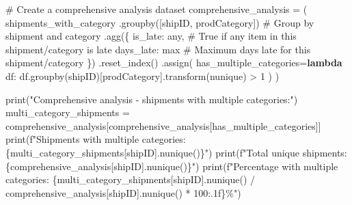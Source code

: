 \documentclass[
]{article}
\newenvironment{Shaded}{\begin{snugshade}}{\end{snugshade}}
\newcommand{\BuiltInTok}[1]{\textcolor[rgb]{0.00,0.23,0.31}{#1}}
\newcommand{\CommentTok}[1]{\textcolor[rgb]{0.37,0.37,0.37}{#1}}
\newcommand{\DecValTok}[1]{\textcolor[rgb]{0.68,0.00,0.00}{#1}}
\newcommand{\KeywordTok}[1]{\textcolor[rgb]{0.00,0.23,0.31}{\textbf{#1}}}
\newcommand{\NormalTok}[1]{\textcolor[rgb]{0.00,0.23,0.31}{#1}}
\newcommand{\OperatorTok}[1]{\textcolor[rgb]{0.37,0.37,0.37}{#1}}
\newcommand{\SpecialCharTok}[1]{\textcolor[rgb]{0.37,0.37,0.37}{#1}}
\newcommand{\SpecialStringTok}[1]{\textcolor[rgb]{0.13,0.47,0.30}{#1}}
\newcommand{\StringTok}[1]{\textcolor[rgb]{0.13,0.47,0.30}{#1}}
\begin{document}
\label{mental-model-7-comprehensive}
\begin{Shaded}
\begin{Highlighting}[]
\CommentTok{\# Create a comprehensive analysis dataset}
\NormalTok{comprehensive\_analysis }\OperatorTok{=}\NormalTok{ (}
\NormalTok{    shipments\_with\_category}
\NormalTok{    .groupby([}\StringTok{\textquotesingle{}shipID\textquotesingle{}}\NormalTok{, }\StringTok{\textquotesingle{}prodCategory\textquotesingle{}}\NormalTok{])  }\CommentTok{\# Group by shipment and category}
\NormalTok{    .agg(\{}
        \StringTok{\textquotesingle{}is\_late\textquotesingle{}}\NormalTok{: }\StringTok{\textquotesingle{}any\textquotesingle{}}\NormalTok{,  }\CommentTok{\# True if any item in this shipment/category is late}
        \StringTok{\textquotesingle{}days\_late\textquotesingle{}}\NormalTok{: }\StringTok{\textquotesingle{}max\textquotesingle{}}  \CommentTok{\# Maximum days late for this shipment/category}
\NormalTok{    \})}
\NormalTok{    .reset\_index()}
\NormalTok{    .assign(}
\NormalTok{        has\_multiple\_categories}\OperatorTok{=}\KeywordTok{lambda}\NormalTok{ df: df.groupby(}\StringTok{\textquotesingle{}shipID\textquotesingle{}}\NormalTok{)[}\StringTok{\textquotesingle{}prodCategory\textquotesingle{}}\NormalTok{].transform(}\StringTok{\textquotesingle{}nunique\textquotesingle{}}\NormalTok{) }\OperatorTok{\textgreater{}} \DecValTok{1}
\NormalTok{    )}
\NormalTok{)}

\BuiltInTok{print}\NormalTok{(}\StringTok{"Comprehensive analysis {-} shipments with multiple categories:"}\NormalTok{)}
\NormalTok{multi\_category\_shipments }\OperatorTok{=}\NormalTok{ comprehensive\_analysis[comprehensive\_analysis[}\StringTok{\textquotesingle{}has\_multiple\_categories\textquotesingle{}}\NormalTok{]]}
\BuiltInTok{print}\NormalTok{(}\SpecialStringTok{f"Shipments with multiple categories: }\SpecialCharTok{\{}\NormalTok{multi\_category\_shipments[}\StringTok{\textquotesingle{}shipID\textquotesingle{}}\NormalTok{]}\SpecialCharTok{.}\NormalTok{nunique()}\SpecialCharTok{\}}\SpecialStringTok{"}\NormalTok{)}
\BuiltInTok{print}\NormalTok{(}\SpecialStringTok{f"Total unique shipments: }\SpecialCharTok{\{}\NormalTok{comprehensive\_analysis[}\StringTok{\textquotesingle{}shipID\textquotesingle{}}\NormalTok{]}\SpecialCharTok{.}\NormalTok{nunique()}\SpecialCharTok{\}}\SpecialStringTok{"}\NormalTok{)}
\BuiltInTok{print}\NormalTok{(}\SpecialStringTok{f"Percentage with multiple categories: }\SpecialCharTok{\{}\NormalTok{multi\_category\_shipments[}\StringTok{\textquotesingle{}shipID\textquotesingle{}}\NormalTok{]}\SpecialCharTok{.}\NormalTok{nunique() }\OperatorTok{/}\NormalTok{ comprehensive\_analysis[}\StringTok{\textquotesingle{}shipID\textquotesingle{}}\NormalTok{]}\SpecialCharTok{.}\NormalTok{nunique() }\OperatorTok{*} \DecValTok{100}\SpecialCharTok{:.1f\}}\SpecialStringTok{\%"}\NormalTok{)}
\end{Highlighting}
\end{Shaded}
\end{document}
